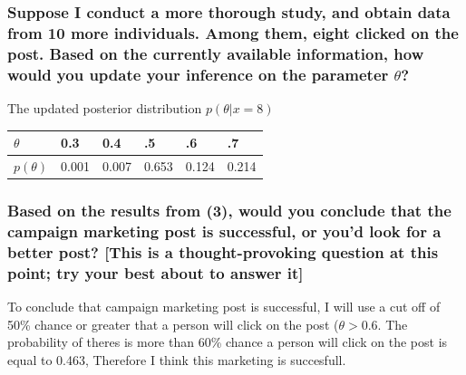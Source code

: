 \documentclass[
]{article}
\begin{document}
\hypertarget{suppose-i-conduct-a-more-thorough-study-and-obtain-data-from-10-more-individuals.-among-them-eight-clicked-on-the-post.-based-on-the-currently-available-information-how-would-you-update-your-inference-on-the-parameter-theta}{%
\subsubsection{\texorpdfstring{Suppose I conduct a more thorough study,
and obtain data from 10 more individuals. Among them, eight clicked on
the post. Based on the currently available information, how would you
update your inference on the parameter
\(\theta\)?}{Suppose I conduct a more thorough study, and obtain data from 10 more individuals. Among them, eight clicked on the post. Based on the currently available information, how would you update your inference on the parameter \textbackslash theta?}}\label{suppose-i-conduct-a-more-thorough-study-and-obtain-data-from-10-more-individuals.-among-them-eight-clicked-on-the-post.-based-on-the-currently-available-information-how-would-you-update-your-inference-on-the-parameter-theta}}

The updated posterior distribution \(p(\theta|x = 8)\)

\begin{longtable}[]{@{}llllll@{}}
\toprule
\(\theta\) & 0.3 & 0.4 & .5 & .6 & .7\tabularnewline
\midrule
\endhead
\(p(\theta)\) & 0.001 & 0.007 & 0.653 & 0.124 & 0.214\tabularnewline
\bottomrule
\end{longtable}

\hypertarget{based-on-the-results-from-3-would-you-conclude-that-the-campaign-marketing-post-is-successful-or-youd-look-for-a-better-post-this-is-a-thought-provoking-question-at-this-point-try-your-best-about-to-answer-it}{%
\subsubsection{Based on the results from (3), would you conclude that
the campaign marketing post is successful, or you'd look for a better
post? {[}This is a thought-provoking question at this point; try your
best about to answer
it{]}}\label{based-on-the-results-from-3-would-you-conclude-that-the-campaign-marketing-post-is-successful-or-youd-look-for-a-better-post-this-is-a-thought-provoking-question-at-this-point-try-your-best-about-to-answer-it}}

To conclude that campaign marketing post is successful, I will use a cut
off of 50\% chance or greater that a person will click on the post
(\(\theta >0.6\). The probability of theres is more than 60\% chance a
person will click on the post is equal to 0.463, Therefore I think this
marketing is succesfull.
\end{document}
